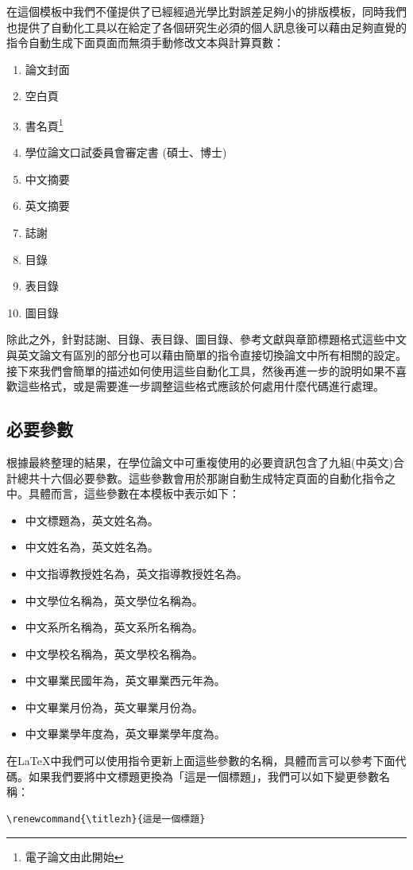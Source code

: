 \documentclass[12pt]{report}
\theoremstyle{plain}
\begin{document}
在這個模板中我們不僅提供了已經經過光學比對誤差足夠小的排版模板，同時我們也提供了自動化工具以在給定了各個研究生必須的個人訊息後可以藉由足夠直覺的指令自動生成下面頁面而無須手動修改文本與計算頁數：
\begin{enumerate}
    \item 論文封面
    \item 空白頁
    \item 書名頁\footnote{電子論文由此開始}
    \item 學位論文口試委員會審定書 (碩士、博士)
    \item 中文摘要
    \item 英文摘要
    \item 誌謝
    \item 目錄
    \item 表目錄
    \item 圖目錄
\end{enumerate}
除此之外，針對誌謝、目錄、表目錄、圖目錄、參考文獻與章節標題格式這些中文與英文論文有區別的部分也可以藉由簡單的指令直接切換論文中所有相關的設定。接下來我們會簡單的描述如何使用這些自動化工具，然後再進一步的說明如果不喜歡這些格式，或是需要進一步調整這些格式應該於何處用什麼代碼進行處理。

\subsection{必要參數}

根據最終整理的結果，在學位論文中可重複使用的必要資訊包含了九組(中英文)合計總共十六個必要參數。這些參數會用於那謝自動生成特定頁面的自動化指令之中。具體而言，這些參數在本模板中表示如下：
\begin{itemize}
    \item 中文標題為，英文姓名為。
    \item 中文姓名為，英文姓名為。
    \item 中文指導教授姓名為，英文指導教授姓名為。
    \item 中文學位名稱為，英文學位名稱為。
    \item 中文系所名稱為，英文系所名稱為。
    \item 中文學校名稱為，英文學校名稱為。
    \item 中文畢業民國年為，英文畢業西元年為。
    \item 中文畢業月份為，英文畢業月份為。
    \item 中文畢業學年度為，英文畢業學年度為。
\end{itemize}
在\LaTeX 中我們可以使用指令更新上面這些參數的名稱，具體而言可以參考下面代碼。如果我們要將中文標題更換為「這是一個標題」，我們可以如下變更參數名稱：
\begin{lstlisting}
\renewcommand{\titlezh}{這是一個標題}
\end{lstlisting}
\end{document}
